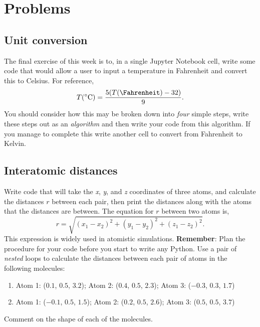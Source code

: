 \documentclass[a4paper]{article}
\begin{document}
\section{Problems}

\subsection{Unit conversion}

The final exercise of this week is to, in a single Jupyter Notebook cell, write some code that would allow a user to input a temperature in Fahrenheit and convert this to Celsius.
For reference,
\begin{equation}
	T (\si{\celsius}) = \frac{5 ( T(\si{\Fahrenheit}) - 32)}{9}.
\end{equation}
You should consider how this may be broken down into \emph{four} simple steps, write these steps out as an \emph{algorithm} and then write your code from this algorithm.
If you manage to complete this write another cell to convert from Fahrenheit to Kelvin.

\subsection{Interatomic distances}

Write code that will take the \emph{x}, \emph{y}, and \emph{z} coordinates of three atoms, and calculate the distances $r$ between each pair, then print the distances along with the atoms that the distances are between.
The equation for $r$ between two atoms is,
\begin{equation}
	r = \sqrt{(x_1 - x_2)^2 + (y_1 - y_2)^2 + (z_1 - z_2)^2}.
\end{equation}
This expression is widely used in atomistic simulations.
\textbf{Remember}: Plan the procedure for your code before you start to write any Python.
Use a pair of \emph{nested} loops to calculate the distances between each pair of atoms in the following molecules:
\begin{enumerate}
	\item{Atom 1: ($0.1$, $0.5$, $3.2$); Atom 2: ($0.4$, $0.5$, $2.3$); Atom 3: ($-0.3$, $0.3$, $1.7$)}
	\item{Atom 1: ($-0.1$, $0.5$, $1.5$); Atom 2: ($0.2$, $0.5$, $2.6$); Atom 3: ($0.5$, $0.5$, $3.7$)}
\end{enumerate}
Comment on the shape of each of the molecules.



\end{document}
